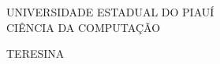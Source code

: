 \documentclass[
	12pt,				%
	openright,			%
	oneside,			%
	a4paper,			%
	chapter=TITLE,		%
	english,			%
	brazil,				%
	]{abntex2}
\renewcommand{\ABNTEXchapterfont}{\normalfont}
\begin{document}
\frenchspacing 


    \begin{center}
    {\ABNTEXchapterfont\large UNIVERSIDADE ESTADUAL DO PIAUÍ}\\
    {\ABNTEXchapterfont\large CIÊNCIA DA COMPUTAÇÃO}
    
    \vspace*{\fill}\vspace*{\fill}
    {\ABNTEXchapterfont\large \imprimirautor}  
    \vspace*{\fill}
   
    \vspace*{\fill}\vspace*{\fill}
    \begin{center}
    \ABNTEXchapterfont \bfseries \Large \imprimirtitulo
    \end{center}
    \vspace*{\fill}\vspace*{\fill}
   
  
   \end{center}  

      
    \begin{center}
    \vspace*{0.5cm}
    {\ABNTEXchapterfont\large TERESINA}
    \par
    {\ABNTEXchapterfont\large \imprimirdata}
    \vspace*{1cm}
    \end{center}

\end{document}
